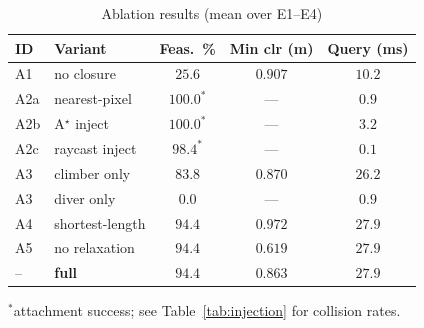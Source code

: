 \documentclass[conference]{IEEEtran}
\begin{document}
\begin{table}[htbp]
\caption{Ablation results (mean over E1--E4)}
\label{tab:ablation}
\begin{center}
\begin{tabular}{@{}llccc@{}}
\toprule
\textbf{ID} & \textbf{Variant} & \textbf{Feas.\ \%} & \textbf{Min clr (m)} & \textbf{Query (ms)} \\ \midrule
A1 & no closure & $25.6$ & $0.907$ & $10.2$ \\
A2a & nearest-pixel & $100.0^{\ast}$ & --- & $0.9$ \\
A2b & A$^\star$ inject & $100.0^{\ast}$ & --- & $3.2$ \\
A2c & raycast inject & $98.4^{\ast}$ & --- & $0.1$ \\
A3 & climber only & $83.8$ & $0.870$ & $26.2$ \\
A3 & diver only & $0.0$ & --- & $0.9$ \\
A4 & shortest-length & $94.4$ & $0.972$ & $27.9$ \\
A5 & no relaxation & $94.4$ & $0.619$ & $27.9$ \\
-- & \textbf{full} & $\mathbf{94.4}$ & $0.863$ & $27.9$ \\ \bottomrule
\end{tabular}
\end{center}
\footnotesize $^{\ast}$attachment success; see Table~\ref{tab:injection} for collision rates.
\end{table}
\end{document}
